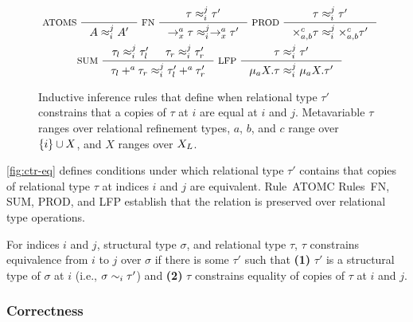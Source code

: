 \begin{figure}
  \centering
  \begin{gather*}
    \inference[ ATOMS ]{ }{ A \copyrel{i}{j} A' } 
    \inference[ FN ]{ 
      \tau \copyrel{i}{j} \tau' }{
      \to_x^a \tau \copyrel{i}{j} \to_x^a \tau' } 
    \inference[ PROD ]{
      \tau \copyrel{i}{j} \tau' }{
      \times_{a, b}^c \tau \copyrel{i}{j} \times_{a, b}^c \tau' } \\
    \inference[ SUM ]{
      \tau_l \copyrel{i}{j} \tau_l' & %
      \tau_r \copyrel{i}{j} \tau_r' }{
      \tau_l +^a \tau_r \copyrel{i}{j} \tau_l' +^a \tau_r' }
    \inference[ LFP ]{
      \tau \copyrel{i}{j} \tau' }{
      \mu_a X. \tau \copyrel{i}{j} \mu_a X. \tau' }
  \end{gather*}
  \caption{Inductive inference rules that define when relational type $\tau'$ constrains that a copies of $\tau$ at $i$ are equal at $i$ and $j$.
    Metavariable $\tau$ ranges over relational refinement types, %
    $a$, $b$, and $c$ range over $\{ i \} \cup X$, and %
    $X$ ranges over $X_L$. }
  \label{fig:ctr-eq}
\end{figure}
%
\autoref{fig:ctr-eq} defines conditions under which relational type
$\tau'$ contains that copies of relational type $\tau$ at indices $i$
and $j$ are equivalent.
%
Rule~ATOMC 
%
Rules~FN, SUM, PROD, and LFP establish that the relation is preserved
over relational type operations.

For indices $i$ and $j$, structural type $\sigma$, and relational type
$\tau$, $\tau$ constrains equivalence from $i$ to $j$ over $\sigma$ if
there is some $\tau'$ such that \textbf{(1)} $\tau'$ is a structural
type of $\sigma$ at $i$ (i.e., $\sigma \sim_{i} \tau'$) and
\textbf{(2)} $\tau$ constrains equality of copies of $\tau$ at $i$ and
$j$.

\subsubsection{Correctness}
\label{sec:corr}

